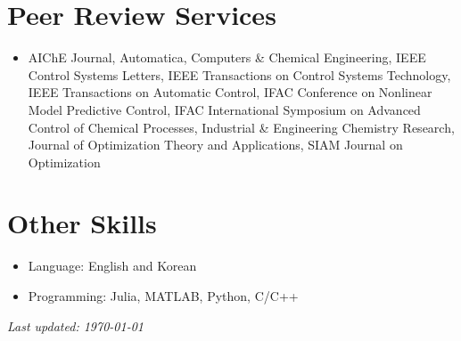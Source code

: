 \documentclass{article}
\begin{document}
\section*{Peer Review Services}
\begin{itemize}[leftmargin=*]
\item[] AIChE Journal, Automatica, Computers \& Chemical Engineering, IEEE Control Systems Letters, IEEE Transactions on Control Systems Technology, IEEE Transactions on Automatic Control, IFAC Conference on Nonlinear Model Predictive Control, IFAC International Symposium on Advanced Control of Chemical Processes, Industrial \& Engineering Chemistry Research, Journal of Optimization Theory and Applications, SIAM Journal on Optimization
\end{itemize}

\section*{Other Skills}
\begin{itemize}[leftmargin=*]
\item[] Language: English and Korean
\item[] Programming: Julia, MATLAB, Python, C/C++
\end{itemize}

{\noindent\it Last updated: \today}
\end{document}
